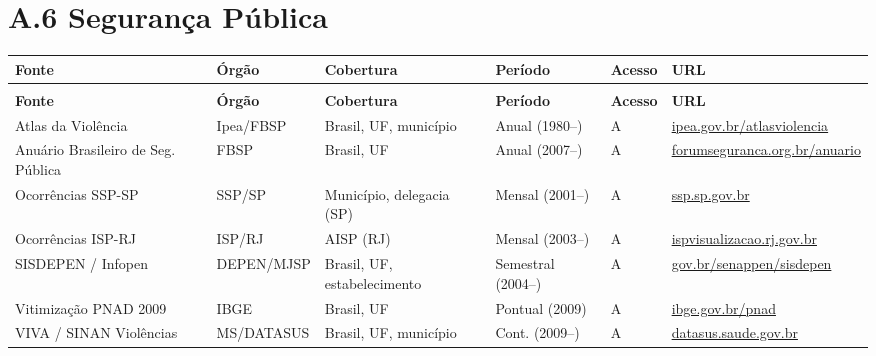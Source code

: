 \section*{A.6 Segurança Pública}

{\setlength{\tabcolsep}{3pt}\footnotesize\begin{longtable}{@{} >{\raggedright\arraybackslash}p{2.9cm} >{\raggedright\arraybackslash}p{2.3cm} >{\raggedright\arraybackslash}p{2.4cm} >{\raggedright\arraybackslash}p{2.4cm} >{\raggedright\arraybackslash}p{1.1cm} >{\raggedright\arraybackslash}p{3.2cm} @{}}
\toprule
\textbf{Fonte} & \textbf{Órgão} & \textbf{Cobertura} & \textbf{Período} & \textbf{Acesso} & \textbf{URL} \\
\midrule
\endfirsthead
\multicolumn{6}{l}{\small\textit{(continuação)}} \\
\toprule
\textbf{Fonte} & \textbf{Órgão} & \textbf{Cobertura} & \textbf{Período} & \textbf{Acesso} & \textbf{URL} \\
\midrule
\endhead
\bottomrule
\endfoot

Atlas da Violência
  & Ipea/FBSP
  & Brasil, UF, município
  & Anual (1980--)
  & A
  & \url{ipea.gov.br/atlasviolencia} \\

Anuário Brasileiro de Seg. Pública
  & FBSP
  & Brasil, UF
  & Anual (2007--)
  & A
  & \url{forumseguranca.org.br/anuario} \\

Ocorrências SSP-SP
  & SSP/SP
  & Município, delegacia (SP)
  & Mensal (2001--)
  & A
  & \url{ssp.sp.gov.br} \\

Ocorrências ISP-RJ
  & ISP/RJ
  & AISP (RJ)
  & Mensal (2003--)
  & A
  & \url{ispvisualizacao.rj.gov.br} \\

SISDEPEN / Infopen
  & DEPEN/MJSP
  & Brasil, UF, estabelecimento
  & Semestral (2004--)
  & A
  & \url{gov.br/senappen/sisdepen} \\

Vitimização PNAD 2009
  & IBGE
  & Brasil, UF
  & Pontual (2009)
  & A
  & \url{ibge.gov.br/pnad} \\

VIVA / SINAN Violências
  & MS/DATASUS
  & Brasil, UF, município
  & Cont. (2009--)
  & A
  & \url{datasus.saude.gov.br} \\

\end{longtable}}

